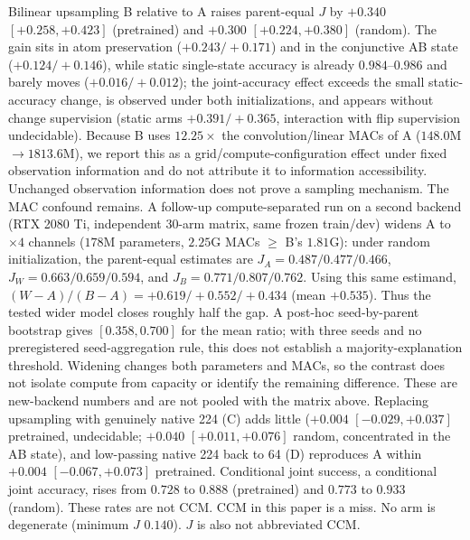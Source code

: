 Bilinear upsampling B relative to A raises parent-equal $J$ by $+0.340$ $[+0.258,+0.423]$ (pretrained) and $+0.300$ $[+0.224,+0.380]$ (random). The gain sits in atom preservation ($+0.243/+0.171$) and in the conjunctive AB state ($+0.124/+0.146$), while static single-state accuracy is already $0.984$--$0.986$ and barely moves ($+0.016/+0.012$); the joint-accuracy effect exceeds the small static-accuracy change, is observed under both initializations, and appears without change supervision (static arms $+0.391/+0.365$, interaction with flip supervision undecidable). Because B uses $12.25\times$ the convolution/linear MACs of A ($148.0$M$\to1813.6$M), we report this as a grid/compute-configuration effect under fixed observation information and do not attribute it to information accessibility. Unchanged observation information does not prove a sampling mechanism. The MAC confound remains. A follow-up compute-separated run on a second backend (RTX 2080 Ti, independent 30-arm matrix, same frozen train/dev) widens A to $\times4$ channels ($178$M parameters, $2.25$G MACs $\ge$ B's $1.81$G): under random initialization, the parent-equal estimates are $J_A=0.487/0.477/0.466$, $J_W=0.663/0.659/0.594$, and $J_B=0.771/0.807/0.762$. Using this same estimand, $(W-A)/(B-A)=+0.619/+0.552/+0.434$ (mean $+0.535$). Thus the tested wider model closes roughly half the gap. A post-hoc seed-by-parent bootstrap gives $[0.358,0.700]$ for the mean ratio; with three seeds and no preregistered seed-aggregation rule, this does not establish a majority-explanation threshold. Widening changes both parameters and MACs, so the contrast does not isolate compute from capacity or identify the remaining difference. These are new-backend numbers and are not pooled with the matrix above. Replacing upsampling with genuinely native 224 (C) adds little ($+0.004$ $[-0.029,+0.037]$ pretrained, undecidable; $+0.040$ $[+0.011,+0.076]$ random, concentrated in the AB state), and low-passing native 224 back to 64 (D) reproduces A within $+0.004$ $[-0.067,+0.073]$ pretrained. Conditional joint success, a conditional joint accuracy, rises from $0.728$ to $0.888$ (pretrained) and $0.773$ to $0.933$ (random). These rates are not CCM. CCM in this paper is a miss. No arm is degenerate (minimum $J$ $0.140$). $J$ is also not abbreviated CCM.

